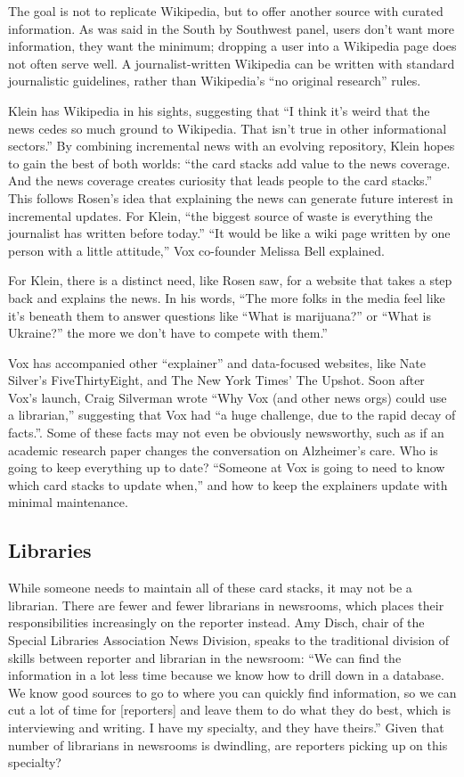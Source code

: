 The goal is not to replicate Wikipedia, but to offer another source with curated information. As was said in the South by Southwest panel, users don't want more information, they want the minimum; dropping a user into a Wikipedia page does not often serve well. A journalist-written Wikipedia can be written with standard journalistic guidelines, rather than Wikipedia's ``no original research'' rules.

Klein has Wikipedia in his sights, suggesting that ``I think it's weird that the news cedes so much ground to Wikipedia. That isn't true in other informational sectors.'' By combining incremental news with an evolving repository, Klein hopes to gain the best of both worlds: ``the card stacks add value to the news coverage. And the news coverage creates curiosity that leads people to the card stacks.'' This follows Rosen's idea that explaining the news can generate future interest in incremental updates. For Klein, ``the biggest source of waste is everything the journalist has written before today.''\autocite{nyt_vox_melding} ``It would be like a wiki page written by one person with a little attitude,'' Vox co-founder Melissa Bell explained.

For Klein, there is a distinct need, like Rosen saw, for a website that takes a step back and explains the news. In his words, ``The more folks in the media feel like it's beneath them to answer questions like ``What is marijuana?'' or ``What is Ukraine?'' the more we don't have to compete with them.''

Vox has accompanied other ``explainer'' and data-focused websites, like Nate Silver's FiveThirtyEight, and The New York Times' The Upshot. Soon after Vox's launch, Craig Silverman wrote ``Why Vox (and other news orgs) could use a librarian,'' suggesting that Vox had ``a huge challenge, due to the rapid decay of facts.''.\autocite{}  Some of these facts may not even be obviously newsworthy, such as if an academic research paper changes the conversation on Alzheimer's care. Who is going to keep everything up to date? ``Someone at Vox is going to need to know which card stacks to update when,'' and how to keep the explainers update with minimal maintenance.

\subsection{Libraries}

While someone needs to maintain all of these card stacks, it may not be a librarian. There are fewer and fewer librarians in newsrooms, which places their responsibilities increasingly on the reporter instead. Amy Disch, chair of the Special Libraries Association News Division, speaks to the traditional division of skills between reporter and librarian in the newsroom: ``We can find the information in a lot less time because we know how to drill down in a database. We know good sources to go to where you can quickly find information, so we can cut a lot of time for [reporters] and leave them to do what they do best, which is interviewing and writing. I have my specialty, and they have theirs.''\autocite{} Given that number of librarians in newsrooms is dwindling, are reporters picking up on this specialty?

